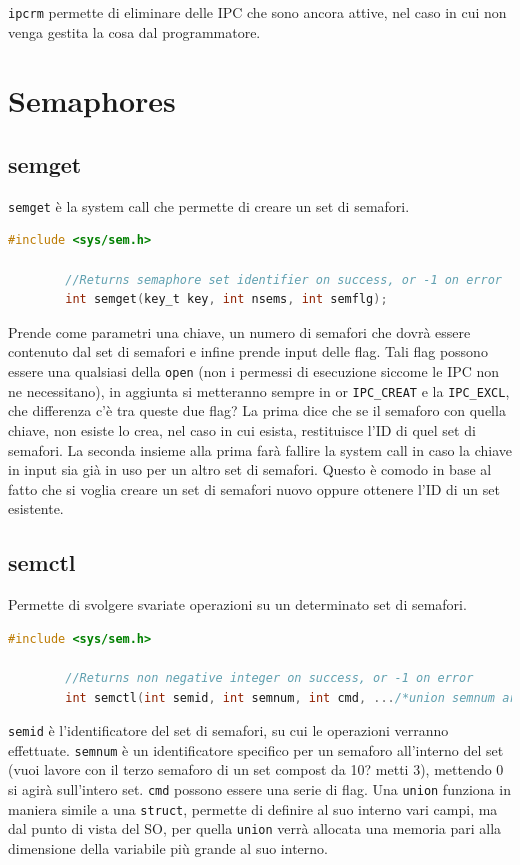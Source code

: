 \documentclass[a4paper, 12pt]{book}
\begin{document}
    \verb|ipcrm| permette di eliminare delle IPC che sono 
    ancora attive, nel caso in cui non venga gestita la cosa 
    dal programmatore.

    \section{Semaphores}

    \subsection{semget}

    \verb|semget| è la system call che permette di creare 
    un set di semafori.
    \begin{lstlisting}[language=C]
        #include <sys/sem.h>

        //Returns semaphore set identifier on success, or -1 on error 
        int semget(key_t key, int nsems, int semflg);
    \end{lstlisting}
    Prende come parametri una chiave, un numero di semafori 
    che dovrà essere contenuto dal set di semafori e infine 
    prende input delle flag. Tali flag possono essere 
    una qualsiasi della \verb|open| (non i permessi di 
    esecuzione siccome le IPC non ne necessitano), in aggiunta 
    si metteranno sempre in or \verb|IPC_CREAT| e la 
    \verb|IPC_EXCL|, che differenza c'è tra queste due flag? 
    La prima dice che se il semaforo con quella chiave, non 
    esiste lo crea, nel caso in cui esista, restituisce 
    l'ID di quel set di semafori. La seconda insieme alla prima
    farà fallire la system call in caso la chiave in input sia 
    già in uso per un altro set di semafori. Questo è comodo 
    in base al fatto che si voglia creare un set di semafori nuovo 
    oppure ottenere l'ID di un set esistente.

    \subsection{semctl}

    Permette di svolgere svariate operazioni su un determinato 
    set di semafori.
    \begin{lstlisting}[language=C]
        #include <sys/sem.h>

        //Returns non negative integer on success, or -1 on error 
        int semctl(int semid, int semnum, int cmd, .../*union semnum arg*/);
    \end{lstlisting}
    \verb|semid| è l'identificatore del set di semafori, su 
    cui le operazioni verranno effettuate. \verb|semnum|
    è un identificatore specifico per un semaforo all'interno del 
    set (vuoi lavore con il terzo semaforo di un set compost da 10? metti 3),
    mettendo 0 si agirà sull'intero set.
    \verb|cmd| possono essere una serie di flag. Una \verb|union| 
    funziona in maniera simile a una \verb|struct|, permette di definire al 
    suo interno vari campi, ma dal punto di vista del SO, 
    per quella \verb|union| verrà allocata una memoria pari alla 
    dimensione della variabile più grande al suo interno.
\end{document}
